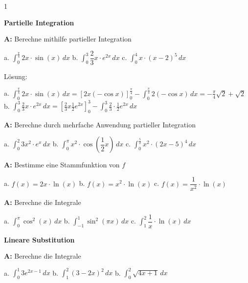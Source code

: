 \documentclass[landscape,twocolumn,a4paper]{article}
\begin{document}
\newcommand{\ggT}{\operatorname{ggT}}
\newcommand{\Mod}[3]{#1\equiv#2\text{ mod }#3}
\newcommand{\tmod}{\text{ mod }}
\newcommand\x{1}
\setcounter {y} {1}

\parindent 0mm

\textbf{Partielle Integration} 
\bigskip

\textbf{A:}   
Berechne mithilfe partieller Integration

a.  $\displaystyle\int_0^{\frac{\pi}{4}} 2x \cdot \sin(x) \, dx$ \quad
b.  $\displaystyle\int_0^3 \dfrac{2}{3}x \cdot e^{2x} \, dx$ \quad
c.  $\displaystyle\int_0^4 x \cdot (x-2)^5 \, dx$ \quad
\bigskip 

Lösung: \bigskip 

a. $\displaystyle\int_0^{\frac{\pi}{4}} 2x \cdot \sin(x) \, dx = \left[2x(-\cos x )\right]_0^{\frac{\pi}{4}} - 
 \displaystyle\int_0^{\frac{\pi}{4}}2(-\cos x) \,dx = -\frac{\pi}{4}\sqrt{2} + \sqrt{2}$ \\
 b.  $\displaystyle\int_0^3 \frac{2}{3}x \cdot e^{2x} \, dx =
  \left[\frac{2}{3}x\frac{1}{2}e^{2x}  \right]_0^3 - 
  \displaystyle\int_0^3 \frac{2}{3} \cdot \frac{1}{2}e^{2x} \, dx$ 

\bigskip  {}
\textbf{A:}   
Berechne durch mehrfache Anwendung partieller Integration

a.  $\displaystyle\int_0^2 3x^2 \cdot e^x \, dx$ \quad
b.  $\displaystyle\int_0^{\pi} x^2 \cdot \cos(\dfrac{1}{2}x)\, dx$ \quad
c.  $\displaystyle\int_0^{\frac{5}{2}} x^2\cdot (2x-5)^4 \, dx$ \quad
\bigskip  {}

\textbf{A:}   
Bestimme eine Stammfunktion von $f$

a.  $f(x) = 2x \cdot \ln(x)$ \quad
b.  $f(x) = x^2 \cdot \ln(x)$ \quad
c.  $f(x) = \dfrac{1}{x^2} \cdot \ln(x)$ \quad
\bigskip  {}

\textbf{A:}   
Berechne die Integrale

a.  $\displaystyle\int_0^{\pi} \cos^2(x)\, dx$ \quad
b.  $\displaystyle\int_{-1}^1 \sin^2(\pi x)\, dx$ \quad
c.  $\displaystyle\int_1^2 \dfrac{1}{x} \cdot \ln(x)\, dx$ \quad
\bigskip  {}


\textbf{Lineare Substitution} 
\bigskip

\textbf{A:}  
Berechne die Integrale

a.  $\displaystyle\int_0^1 3e^{2x-1}\, dx$ \quad
b.  $\displaystyle\int_1^2 (3-2x)^2\, dx$ \quad
b.  $\displaystyle\int_0^2 \sqrt{4x+1}\, dx$ \quad
\bigskip  {}
\end{document}
